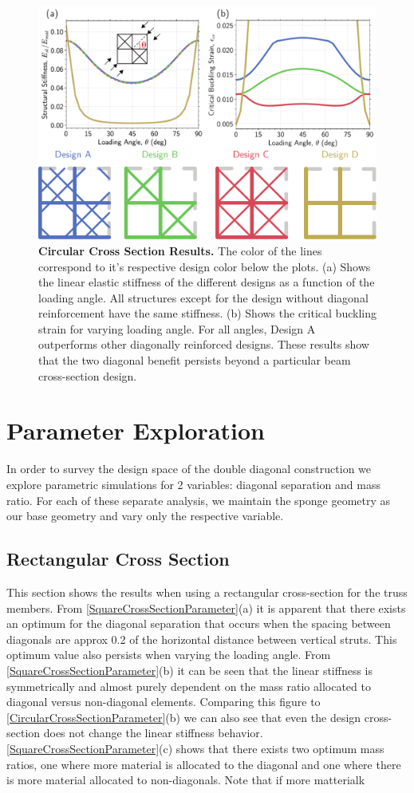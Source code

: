 \documentclass[10pt,twoside]{fernandes_supp}
\begin{document}
\begin{figure}
	\centering
	\includegraphics[width=0.6\linewidth]{SFig7.pdf}
	\caption{{\bf Circular Cross Section Results.} The color of the lines correspond to it's respective design color below the plots. (a) Shows the linear elastic stiffness of the different designs as a function of the loading angle. All structures except for the design without diagonal reinforcement have the same stiffness. (b) Shows the critical buckling strain for varying loading angle. For all angles, Design A outperforms other diagonally reinforced designs. These results show that the two diagonal benefit persists beyond a particular beam cross-section design.}
	
	\label{CircularCrossSection}
\end{figure}
\section{Parameter Exploration}
In order to survey the design space of the double diagonal construction we explore parametric simulations for 2 variables: diagonal separation and mass ratio. For each of these separate analysis, we maintain the sponge geometry as our base geometry and vary only the respective variable. 

\subsection{Rectangular Cross Section}\label{sec:rectparam}
This section shows the results when using a rectangular cross-section for the truss members. From \cref{SquareCrossSectionParameter}(a) it is apparent that there exists an optimum for the diagonal separation that occurs when the spacing between diagonals are approx 0.2 of the horizontal distance between vertical struts. This optimum value also persists when varying the loading angle. From \cref{SquareCrossSectionParameter}(b) it can be seen that the linear stiffness is symmetrically and almost purely dependent on the mass ratio allocated to diagonal versus non-diagonal elements. Comparing this figure to \cref{CircularCrossSectionParameter}(b) we can also see that even the design cross-section does not change the linear stiffness behavior.  \cref{SquareCrossSectionParameter}(c) shows that there exists two optimum mass ratios, one where more material is allocated to the diagonal and one where there is more material allocated to non-diagonals.  Note that if more matterialk
\end{document}
